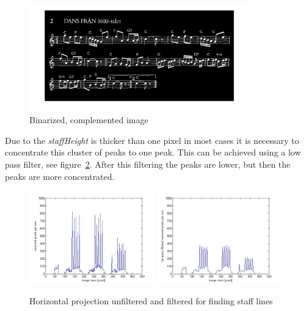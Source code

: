 \begin{figure}[htbp]
    \centering
		\includegraphics[width=0.85\textwidth]{staffBinComp.jpg}
		\caption{Binarized, complemented image\label{fig:staffBinComp}}
\end{figure}

Due to the \textit{staffHeight} is  thicker than one pixel in most cases it is necessary to concentrate this cluster of peaks to one peak. This can be achieved using a low pass filter, see figure~\ref{fig:staffHoriz}. After this filtering the peaks are lower, but then the peaks are more concentrated. 

\begin{figure}[htbp]
    \centering
		\includegraphics[width=0.48\textwidth]{staffHorizontal.jpg}
        \includegraphics[width=0.48\textwidth]{staffHorizontalFiltered.jpg}
		\caption[Horizontal projections finding staff lines]{Horizontal projection unfiltered and filtered for finding staff lines\label{fig:staffHoriz}}
\end{figure}

